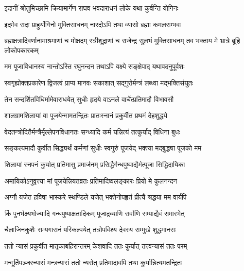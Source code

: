 


\addtocounter{shlokacount}{7}
\twolineshloka
{इदानीं श्रोतुमिच्छामि क्रियामार्गेण राघव}
{भवदाराधनं लोके यथा कुर्वन्ति योगिनः} %

\twolineshloka
{इदमेव सदा प्राहुर्योगिनो मुक्तिसाधनम्}
{नारदोऽपि तथा व्यासो ब्रह्मा कमलसम्भवः} %

\threelineshloka
{ब्रह्मक्षत्रादिवर्णानामाश्रमाणां च मोक्षदम्}
{स्त्रीशूद्राणां च राजेन्द्र सुलभं मुक्तिसाधनम्}
{तव भक्ताय मे भ्रात्रे ब्रूहि लोकोपकारकम्} %


\twolineshloka
{मम पूजाविधानस्य नान्तोऽस्ति रघुनन्दन}
{तथाऽपि वक्ष्ये सङ्क्षेपाद् यथावदनुपूर्वशः} %

\twolineshloka
{स्वगृह्योक्तप्रकारेण द्विजत्वं प्राप्य मानवः}
{सकाशात् सद्गुरोर्मन्त्रं लब्ध्वा मद्भक्तिसंयुतः} %

\twolineshloka
{तेन सन्दर्शितविधिर्मामेवाराधयेत् सुधीः}
{हृदये वाऽनले वार्चेत्प्रतिमादौ विभावसौ} %

\twolineshloka
{शालग्रामशिलायां वा पूजयेन्मामतन्द्रितः}
{प्रातःस्नानं प्रकुर्वीत प्रथमं देहशुद्धये} %

\twolineshloka
{वेदतन्त्रोदितैर्मन्त्रैर्मृल्लेपनविधानतः}
{सन्ध्यादि कर्म यन्नित्यं तत्कुर्याद् विधिना बुधः} %

\twolineshloka
{सङ्कल्पमादौ कुर्वीत सिद्ध्यर्थं कर्मणां सुधीः}
{स्वगुरुं पूजयेद् भक्त्या मद्बुद्ध्या पूजको मम} %

\twolineshloka
{शिलायां स्नपनं कुर्यात् प्रतिमासु प्रमार्जनम्}
{प्रसिद्धैर्गन्धपुष्पाद्यैर्मत्पूजा सिद्धिदायिका} %

\twolineshloka
{अमायिकोऽनुवृत्त्या मां पूजयेन्नियतव्रतः}
{प्रतिमादिष्वलङ्कारः प्रियो मे कुलनन्दन} %

\twolineshloka
{अग्नौ यजेत हविषा भास्करे स्थण्डिले यजेत्}
{भक्तेनोपहृतं प्रीत्यै श्रद्धया मम वार्यपि} %

\twolineshloka
{किं पुनर्भक्ष्यभोज्यादि गन्धपुष्पाक्षतादिकम्}
{पूजाद्रव्याणि सर्वाणि सम्पाद्यैवं समारभेत्} %

\twolineshloka
{चैलाजिनकुशैः सम्यगासनं परिकल्पयेत्}
{तत्रोपविश्य देवस्य सम्मुखे शुद्धमानसः} %

\twolineshloka
{ततो न्यासं प्रकुर्वीत मातृकाबहिरान्तरम्}
{केशवादि ततः कुर्यात् तत्त्वन्यासं ततः परम्} %

\twolineshloka
{मन्मूर्तिपञ्जरन्यासं मन्त्रन्यासं ततो न्यसेत्}
{प्रतिमादावपि तथा कुर्यान्नित्यमतन्द्रितः} %

